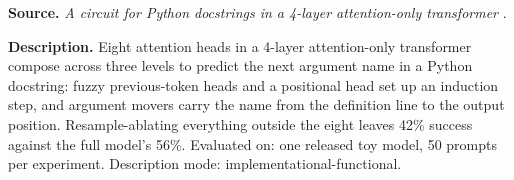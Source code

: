 
\textbf{Source.} \emph{A circuit for Python docstrings in a 4-layer attention-only transformer} \citep{heimersheim2023docstring}.

\textbf{Description.} Eight attention heads in a 4-layer attention-only transformer compose across three levels to predict the next argument name in a Python docstring: fuzzy previous-token heads and a positional head set up an induction step, and argument movers carry the name from the definition line to the output position. Resample-ablating everything outside the eight leaves 42\% success against the full model's 56\%. Evaluated on: one released toy model, 50 prompts per experiment. Description mode: implementational-functional.

\vspace{4pt}
